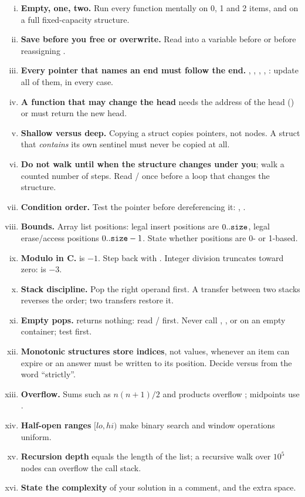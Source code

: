 \begin{enumerate}[(i)]
\item \textbf{Empty, one, two.} Run every function mentally on 0, 1 and 2 items, and on a
  full fixed-capacity structure.
\item \textbf{Save before you free or overwrite.} Read  into a variable
  before  or before reassigning .
\item \textbf{Every pointer that names an end must follow the end.} , ,
  , , : update all of them, in every case.
\item \textbf{A function that may change the head} needs the address of the head
  () or must return the new head.
\item \textbf{Shallow versus deep.} Copying a struct copies pointers, not nodes. A struct
  that \emph{contains} its own sentinel must never be copied at all.
\item \textbf{Do not walk until  when the structure changes under you}; walk a
  counted number of steps. Read / once before a loop that changes
  the structure.
\item \textbf{Condition order.} Test the pointer before dereferencing it:
  , .
\item \textbf{Bounds.} Array list positions: legal insert positions are $0..\texttt{size}$,
  legal erase/access positions $0..\texttt{size}-1$. State whether positions are 0- or
  1-based.
\item \textbf{Modulo in C.}  is $-1$. Step back with .
  Integer division truncates toward zero:  is $-3$.
\item \textbf{Stack discipline.} Pop the right operand first. A transfer between two
  stacks reverses the order; two transfers restore it.
\item \textbf{Empty pops.}  returns nothing: read /
  first. Never call , ,  or  on an empty container;
  test  first.
\item \textbf{Monotonic structures store indices}, not values, whenever an item can
  expire or an answer must be written to its position. Decide \cc{<} versus \cc{<=} from
  the word ``strictly''.
\item \textbf{Overflow.} Sums such as $n(n+1)/2$ and products overflow ; midpoints
  use .
\item \textbf{Half-open ranges} $[\mathit{lo},\mathit{hi})$ make binary search and window
  operations uniform.
\item \textbf{Recursion depth} equals the length of the list; a recursive walk over $10^5$
  nodes can overflow the call stack.
\item \textbf{State the complexity} of your solution in a comment, and the extra space.
\end{enumerate}

